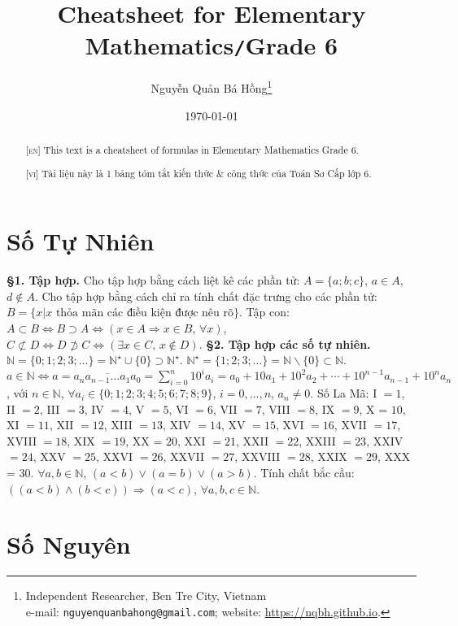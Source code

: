 \documentclass{article}
\title{Cheatsheet for Elementary Mathematics\texttt{/}Grade 6}
\author{\selectlanguage{vietnamese} Nguyễn Quản Bá Hồng\footnote{Independent Researcher, Ben Tre City, Vietnam\\e-mail: \texttt{nguyenquanbahong@gmail.com}; website: \url{https://nqbh.github.io}.}}
\date{\today}
\numberwithin{equation}{section}
\begin{document}
\maketitle
{}
\begin{abstract}
	\textsc{[en]} This text is a cheatsheet of formulas in Elementary Mathematics Grade 6.
	\vspace{2mm}

	\textsc{[vi]} Tài liệu này là 1 bảng tóm tắt kiến thức \& công thức của Toán Sơ Cấp lớp 6.
\end{abstract}
\tableofcontents
\newpage


\section{Số Tự Nhiên}
\textbf{\S1. Tập hợp.} Cho tập hợp bằng cách liệt kê các phần tử: $A = \{a;b;c\}$, $a\in A$, $d\notin A$. Cho tập hợp bằng cách chỉ ra tính chất đặc trưng cho các phần tử: $B = \{x|x\mbox{ thỏa mãn các điều kiện được nêu rõ}\}$. Tập con: $A\subset B\Leftrightarrow B\supset A\Leftrightarrow(x\in A\Rightarrow x\in B,\,\forall x)$, $C\not\subset D\Leftrightarrow D\not\supset C\Leftrightarrow(\exists x\in C,\,x\notin D)$. \textbf{\S2. Tập hợp các số tự nhiên.} $\mathbb{N} = \{0;1;2;3;\ldots\} = \mathbb{N}^\star\cup\{0\}\supset\mathbb{N}^\star$. $\mathbb{N}^\star = \{1;2;3;\ldots\} = \mathbb{N}\backslash\{0\}\subset\mathbb{N}$. $a\in\mathbb{N}\Leftrightarrow a = \overline{a_na_{n-1}\ldots a_1a_0} = \sum_{i=0}^n 10^ia_i = a_0 + 10a_1 + 10^2a_2 + \cdots + 10^{n-1}a_{n-1} + 10^na_n$, với $n\in\mathbb{N}$, $\forall a_i\in\{0;1;2;3;4;5;6;7;8;9\}$, $i = 0,\ldots,n$, $a_n\ne 0$. Số La Mã: I $= 1$, II $= 2$, III $= 3$, IV $= 4$, V $= 5$, VI $= 6$, VII $= 7$, VIII $= 8$, IX $= 9$, X = $10$, XI $= 11$, XII $= 12$, XIII $= 13$, XIV $= 14$, XV $= 15$, XVI $= 16$, XVII $= 17$, XVIII $= 18$, XIX $= 19$, XX = $20$, XXI $= 21$, XXII $= 22$, XXIII $= 23$, XXIV $= 24$, XXV $= 25$, XXVI $= 26$, XXVII $= 27$, XXVIII $= 28$, XXIX $= 29$, XXX = $30$. $\forall a,b\in\mathbb{N}$, $(a < b)\lor(a = b)\lor(a > b)$. Tính chất bắc cầu: $((a < b)\land(b < c))\Rightarrow(a < c)$, $\forall a,b,c\in\mathbb{N}$.


\section{Số Nguyên}
\end{document}
